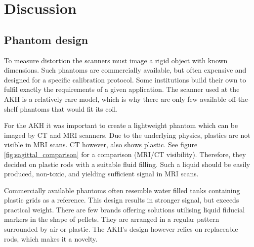 


\chapter{Discussion}

\section{Phantom design}
    
To measure distortion the scanners must image a rigid object with known dimensions.
Such phantoms are commercially available, but often expensive and designed for a specific calibration protocol.
Some institutions build their own to fulfil exactly the requirements of a given application.
The scanner used at the AKH is a relatively rare model, which is why there are only few available off-the-shelf phantoms that would fit its coil.

For the AKH it was important to create a lightweight phantom which can be imaged by CT and MRI scanners.
Due to the underlying physics, plastics are not visible in MRI scans. CT however, also shows plastic.
See figure \ref{fig:sagittal_comparison} for a comparison (MRI/CT visibility).
Therefore, they decided on plastic rods with a suitable fluid filling.
Such a liquid should be easily produced, non-toxic, and yielding sufficient signal in MRI scans.

Commercially available phantoms often resemble water filled tanks containing plastic grids as a reference.
This design results in stronger signal, but exceeds practical weight.
There are few brands offering solutions utilising liquid fiducial markers in the shape of pellets.
They are arranged in a regular pattern surrounded by air or plastic.
The AKH's design however relies on replaceable rods, which makes it a novelty.

